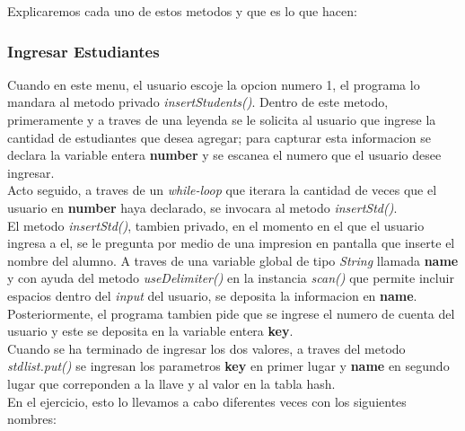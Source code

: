 \documentclass{article}
\begin{document}
		Explicaremos cada uno de estos metodos y que es lo que hacen:\\
		
			\subsubsection{Ingresar Estudiantes}
			
				Cuando en este menu, el usuario escoje la opcion numero 1, el programa lo mandara al metodo privado \emph{insertStudents()}. Dentro de este metodo, primeramente y a traves de una leyenda se le solicita al usuario que ingrese la cantidad de estudiantes que desea agregar; para capturar esta informacion se declara la variable entera \textbf{number} y se escanea el numero que el usuario desee ingresar.\\
				
				Acto seguido, a traves de un \textit{while-loop} que iterara la cantidad de veces que el usuario en \textbf{number} haya declarado, se invocara al metodo \emph{insertStd()}.\\
				
				El metodo \emph{insertStd()}, tambien privado, en el momento en el que el usuario ingresa a el, se le pregunta por medio de una impresion en pantalla que inserte el nombre del alumno. A traves de una variable global de tipo \textit{String} llamada \textbf{name} y con ayuda del metodo \emph{useDelimiter()} en la instancia \emph{scan()} que permite incluir espacios dentro del \textit{input} del usuario, se deposita la informacion en \textbf{name}.\\
				
				Posteriormente, el programa tambien pide que se ingrese el numero de cuenta del usuario y este se deposita en la variable entera \textbf{key}.\\
				
				Cuando se ha terminado de ingresar los dos valores, a traves del metodo \emph{stdlist.put()} se ingresan los parametros \textbf{key} en primer lugar y \textbf{name} en segundo lugar que correponden a la llave y al valor en la tabla hash.\\
				
				En el ejercicio, esto lo llevamos a cabo diferentes veces con los siguientes nombres:
				
\end{document}
